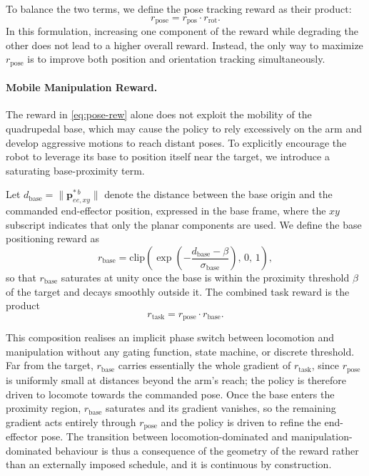 To balance the two terms, we define the pose tracking reward as their product:
%
\begin{equation}
    r_{\text{pose}} = r_{\text{pos}} \cdot r_{\text{rot}}.
    \label{eq:pose-rew}
\end{equation}
%
In this formulation, increasing one component of the reward while degrading the other does not lead to a higher overall reward. Instead, the only way to maximize $r_{\text{pose}}$ is to improve both position and orientation tracking simultaneously.

\paragraph{Mobile Manipulation Reward.}

The reward in \cref{eq:pose-rew} alone does not exploit the mobility of the quadrupedal base, which may cause the policy to rely excessively on the arm and develop aggressive motions to reach distant poses. To explicitly encourage the robot to leverage its base to position itself near the target, we introduce a saturating base-proximity term.

Let $d_{\text{base}} = \lVert \boldsymbol{p}^{*\,b}_{ee,xy} \rVert$ denote the distance between the base origin and the commanded end-effector position, expressed in the base frame, where the $xy$ subscript indicates that only the planar components are used. We define the base positioning reward as
%
\begin{equation}
    r_{\text{base}} = \mathrm{clip}\!\left(
    \exp\!\left(-\frac{d_{\text{base}} - \beta}{\sigma_{\text{base}}}\right),\,0,\,1\right),
    \label{eq:base-rew}
\end{equation}
%
so that $r_{\text{base}}$ saturates at unity once the base is within the proximity threshold $\beta$ of the target and decays smoothly outside it. The combined task reward is the product
%
\begin{equation}
    r_{\text{task}} = r_{\text{pose}} \cdot r_{\text{base}}.
    \label{eq:task-reward}
\end{equation}

This composition realises an implicit phase switch between locomotion and manipulation without any gating function, state machine, or discrete threshold. Far from the target, $r_{\text{base}}$ carries essentially the whole gradient of $r_{\text{task}}$, since $r_{\text{pose}}$ is uniformly small at distances beyond the arm's reach; the policy is therefore driven to locomote towards the commanded pose. Once the base enters the proximity region, $r_{\text{base}}$ saturates and its gradient vanishes, so the remaining gradient acts entirely through $r_{\text{pose}}$ and the policy is driven to refine the end-effector pose. The transition between locomotion-dominated and manipulation-dominated behaviour is thus a consequence of the geometry of the reward rather than an externally imposed schedule, and it is continuous by construction.

